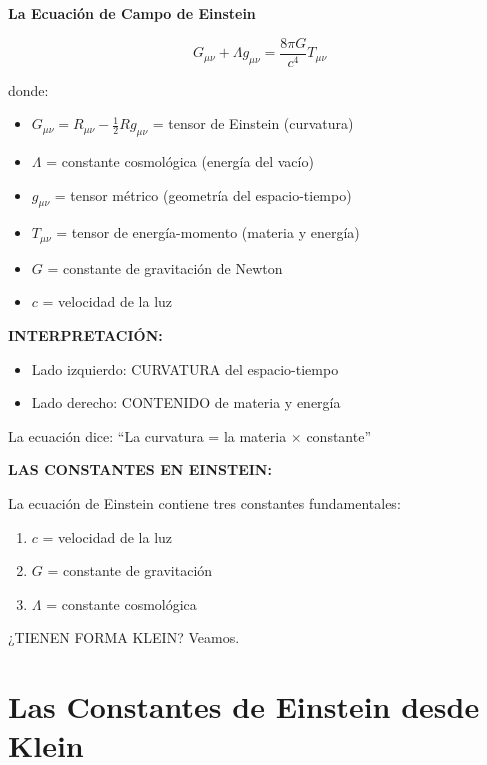 \begin{nivelmatematico}
\textbf{La Ecuación de Campo de Einstein}

\begin{equation}
\boxed{G_{\mu\nu} + \Lambda g_{\mu\nu} = \frac{8\pi G}{c^4} T_{\mu\nu}}
\end{equation}

donde:
\begin{itemize}
    \item $G_{\mu\nu} = R_{\mu\nu} - \frac{1}{2}Rg_{\mu\nu}$ = tensor de Einstein (curvatura)
    \item $\Lambda$ = constante cosmológica (energía del vacío)
    \item $g_{\mu\nu}$ = tensor métrico (geometría del espacio-tiempo)
    \item $T_{\mu\nu}$ = tensor de energía-momento (materia y energía)
    \item $G$ = constante de gravitación de Newton
    \item $c$ = velocidad de la luz
\end{itemize}

\textbf{INTERPRETACIÓN:}
\begin{itemize}
    \item Lado izquierdo: CURVATURA del espacio-tiempo
    \item Lado derecho: CONTENIDO de materia y energía
\end{itemize}

La ecuación dice: ``La curvatura = la materia $\times$ constante''
\end{nivelmatematico}

\textbf{LAS CONSTANTES EN EINSTEIN:}

La ecuación de Einstein contiene tres constantes fundamentales:
\begin{enumerate}
    \item $c$ = velocidad de la luz
    \item $G$ = constante de gravitación
    \item $\Lambda$ = constante cosmológica
\end{enumerate}

¿TIENEN FORMA KLEIN? Veamos.


\section{Las Constantes de Einstein desde Klein}

